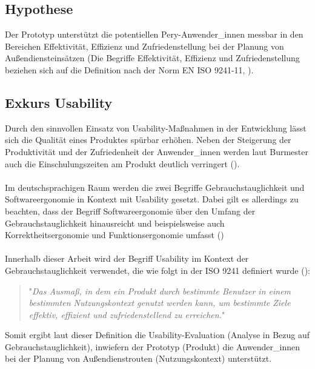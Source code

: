 \documentclass[Bachelorarbeit.tex]{subfiles}
\begin{document}
\subsection{Hypothese}
\label{Hypothese}

Der Prototyp unterstützt die potentiellen Pery-Anwender\_innen messbar in den Bereichen Effektivität, Effizienz und Zufriedenstellung bei der Planung von Außendiensteinsätzen (Die Begriffe Effektivität, Effizienz und Zufriedenstellung beziehen sich auf die Definition nach der Norm EN ISO 9241-11, \cite[vgl.][Abs.: 3]{Iso9241_11}).


\subsection{Exkurs Usability}  
\label{Usability}
Durch den sinnvollen Einsatz von Usability-Maßnahmen in der Entwicklung lässt sich die Qualität eines Produktes spürbar erhöhen.
Neben der Steigerung der Produktivität und der Zufriedenheit der Anwender\_innen werden laut Burmester auch die Einschulungszeiten am Produkt deutlich verringert (\cite[vgl.][352f]{Burmester}).\\
\\
Im deutschsprachigen Raum werden die zwei Begriffe Gebrauchstauglichkeit und Softwareergonomie in Kontext mit Usability gesetzt.
Dabei gilt es allerdings zu beachten, dass der Begriff Softwareergonomie über den Umfang der Gebrauchstauglichkeit hinausreicht und beispielsweise auch Korrektheitsergonomie und Funktionsergonomie umfasst
(\cite[vgl.][420]{Niegemann2008})\\
\\
Innerhalb dieser Arbeit wird der Begriff Usability im Kontext der Gebrauchstauglichkeit verwendet, die wie folgt in der ISO 9241 definiert wurde (\cite[siehe:][Abs.: 3.1 Gebrauchstauglichkeit]{Iso9241_11}):

\begin{quote}
	"\textit{Das Ausmaß, in dem ein Produkt durch bestimmte Benutzer in einem bestimmten Nutzungskontext genutzt werden kann, um bestimmte Ziele effektiv, effizient und zufriedenstellend zu erreichen.}" 
\end{quote}

Somit ergibt laut dieser Definition die Usability-Evaluation (Analyse in Bezug auf Gebrauchstauglichkeit), inwiefern der Prototyp (Produkt) die Anwender\_innen bei der Planung von Außendienstrouten (Nutzungskontext) unterstützt.
\end{document}
